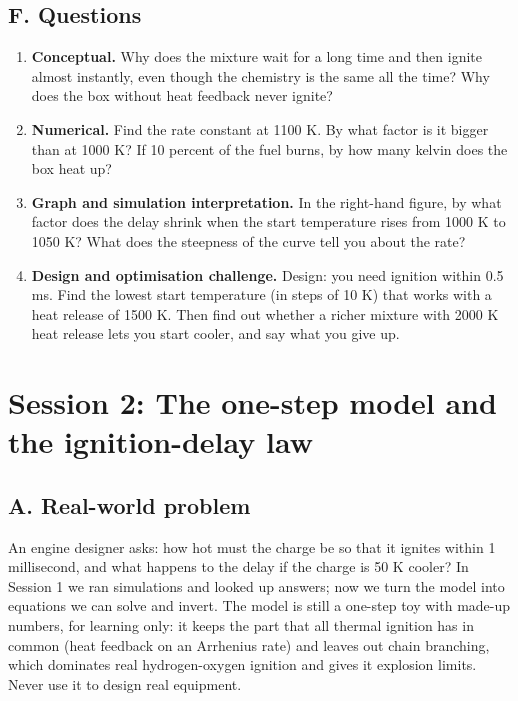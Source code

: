 \documentclass[11pt,a4paper]{article}
\begin{document}
\subsection*{F. Questions}
\begin{enumerate}[nosep]
\item \textbf{Conceptual.} Why does the mixture wait for a long time and then ignite almost instantly, even though the chemistry is the same all the time? Why does the box without heat feedback never ignite?
\item \textbf{Numerical.} Find the rate constant at 1100 K. By what factor is it bigger than at 1000 K? If 10 percent of the fuel burns, by how many kelvin does the box heat up?
\item \textbf{Graph and simulation interpretation.} In the right-hand figure, by what factor does the delay shrink when the start temperature rises from 1000 K to 1050 K? What does the steepness of the curve tell you about the rate?
\item \textbf{Design and optimisation challenge.} Design: you need ignition within 0.5 ms. Find the lowest start temperature (in steps of 10 K) that works with a heat release of 1500 K. Then find out whether a richer mixture with 2000 K heat release lets you start cooler, and say what you give up.
\end{enumerate}

\section{Session 2: The one-step model and the ignition-delay law}

\subsection*{A. Real-world problem}
An engine designer asks: how hot must the charge be so that it ignites within 1 millisecond, and what happens to the delay if the charge is 50 K cooler? In Session 1 we ran simulations and looked up answers; now we turn the model into equations we can solve and invert. The model is still a one-step toy with made-up numbers, for learning only: it keeps the part that all thermal ignition has in common (heat feedback on an Arrhenius rate) and leaves out chain branching, which dominates real hydrogen-oxygen ignition and gives it explosion limits. Never use it to design real equipment.
\end{document}
